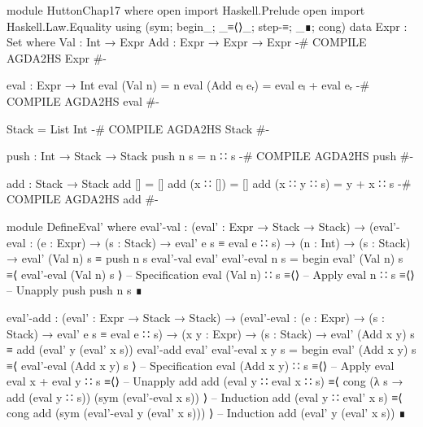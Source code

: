 \documentclass{article}
\begin{document}
\begin{code}
module HuttonChap17 where
open import Haskell.Prelude
open import Haskell.Law.Equality using (sym; begin_; _≡⟨⟩_; step-≡; _∎; cong)
data Expr : Set where
    Val : Int → Expr
    Add : Expr → Expr → Expr
{-# COMPILE AGDA2HS Expr #-}

eval : Expr → Int
eval (Val n) = n
eval (Add eₗ eᵣ) = eval eₗ + eval eᵣ
{-# COMPILE AGDA2HS eval #-}

Stack = List Int
{-# COMPILE AGDA2HS Stack #-}

push : Int → Stack → Stack
push n s = n ∷ s
{-# COMPILE AGDA2HS push #-}

add : Stack → Stack
add [] = []
add (x ∷ []) = []
add (x ∷ y ∷ s) = y + x ∷ s
{-# COMPILE AGDA2HS add #-}

module DefineEval' where
  eval'-val : (eval' : Expr → Stack → Stack)
    → (eval'-eval : (e : Expr) → (s : Stack) → eval' e s ≡ eval e ∷ s)
    → (n : Int) → (s : Stack) → eval' (Val n) s ≡ push n s
  eval'-val eval' eval'-eval n s =
    begin
      eval' (Val n) s
    ≡⟨ eval'-eval (Val n) s ⟩ -- Specification
      eval (Val n) ∷ s
    ≡⟨⟩ -- Apply eval
      n ∷ s
    ≡⟨⟩ -- Unapply push
      push n s
    ∎
\end{code}
\begin{code}
  eval'-add : (eval' : Expr → Stack → Stack)
    → (eval'-eval : (e : Expr) → (s : Stack) → eval' e s ≡ eval e ∷ s)
    → (x y : Expr) → (s : Stack)
    → eval' (Add x y) s ≡ add (eval' y (eval' x s))
  eval'-add eval' eval'-eval x y s =
    begin
      eval' (Add x y) s
    ≡⟨ eval'-eval (Add x y) s ⟩ -- Specification
      eval (Add x y) ∷ s
    ≡⟨⟩ -- Apply eval
      eval x + eval y ∷ s
    ≡⟨⟩ -- Unapply add
      add (eval y ∷ eval x ∷ s)
    ≡⟨ cong (λ s → add (eval y ∷ s)) (sym (eval'-eval x s)) ⟩ -- Induction
      add (eval y ∷ eval' x s)
    ≡⟨ cong add (sym (eval'-eval y (eval' x s))) ⟩ -- Induction
      add (eval' y (eval' x s))
    ∎
\end{code}
\end{document}
